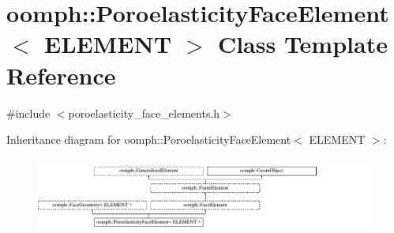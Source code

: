 \hypertarget{classoomph_1_1PoroelasticityFaceElement}{}\section{oomph\+:\+:Poroelasticity\+Face\+Element$<$ E\+L\+E\+M\+E\+NT $>$ Class Template Reference}
\label{classoomph_1_1PoroelasticityFaceElement}


{\ttfamily \#include $<$poroelasticity\+\_\+face\+\_\+elements.\+h$>$}

Inheritance diagram for oomph\+:\+:Poroelasticity\+Face\+Element$<$ E\+L\+E\+M\+E\+NT $>$\+:\begin{figure}[H]
\begin{center}
\leavevmode
\includegraphics[height=2.539683cm]{classoomph_1_1PoroelasticityFaceElement}
\end{center}
\end{figure}
